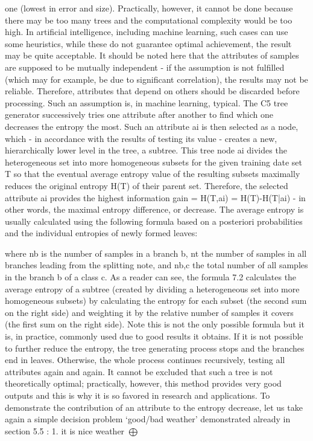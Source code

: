 \documentclass[11pt,openany,executivepaper]{book}
\begin{document}
one (lowest in error and size). Practically, however, it cannot be done because
there may be too many trees and the computational complexity would be too
high. In artificial intelligence, including machine learning, such cases can use
some heuristics, while these do not guarantee optimal achievement, the result
may be quite acceptable.
It should be noted here that the attributes of samples are supposed to be mutually independent - if the assumption is not fulfilled (which may for example,
be due to significant correlation), the results may not be reliable. Therefore, attributes that depend on others should be discarded before processing. Such an
assumption is, in machine learning, typical.
The C5 tree generator successively tries one attribute after another to find
which one decreases the entropy the most. Such an attribute ai
is then selected
as a node, which - in accordance with the results of testing its value - creates a
new, hierarchically lower level in the tree, a subtree.
This tree node ai divides the heterogeneous set into more homogeneous subsets for the given training date set T so that the eventual average entropy value of
the resulting subsets maximally reduces the original entropy H(T) of their parent
set.
Therefore, the selected attribute ai provides the highest information gain =
H(T,ai) = H(T)-H(T|ai) - in other words, the maximal entropy difference, or
decrease.
The average entropy is usually calculated using the following formula based
on a posteriori probabilities and the individual entropies of newly formed leaves:

where nb is the number of samples in a branch b, nt
the number of samples in all
branches leading from the splitting note, and nb,c
the total number of all samples
in the branch b of a class c.
As a reader can see, the formula 7.2 calculates the average entropy of a subtree (created by dividing a heterogeneous set into more homogeneous subsets)
by calculating the entropy for each subset (the second sum on the right side) and
weighting it by the relative number of samples it covers (the first sum on the right
side). Note this is not the only possible formula but it is, in practice, commonly
used due to good results it obtains.
If it is not possible to further reduce the entropy, the tree generating process
stops and the branches end in leaves. Otherwise, the whole process continues
recursively, testing all attributes again and again. It cannot be excluded that such
a tree is not theoretically optimal; practically, however, this method provides very
good outputs and this is why it is so favored in research and applications.
To demonstrate the contribution of an attribute to the entropy decrease, let us
take again a simple decision problem ‘good/bad weather’ demonstrated already
in section 5.5 :
1. it is nice weather $\bigoplus$
\end{document}
